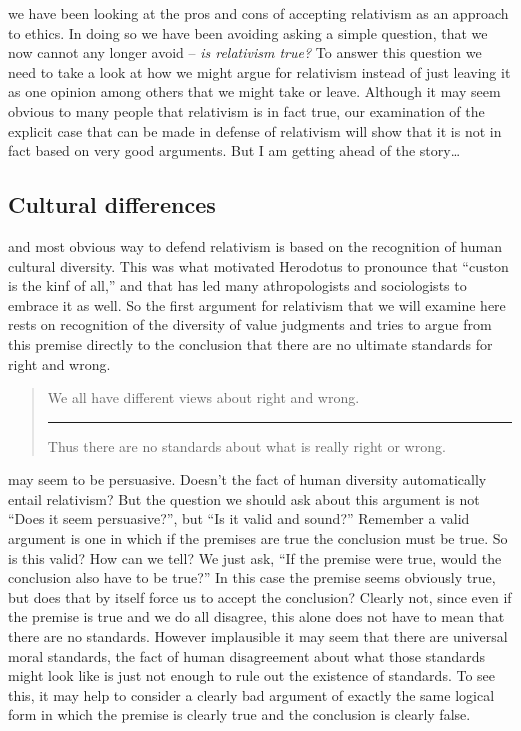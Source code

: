 \documentclass[justified]{tufte-book}
\newenvironment{argument}{\begin{quote}\normalsize}{\end{quote}}
\begin{document}
 we have been looking at the pros and cons of accepting relativism as an approach to ethics. In doing so we have been avoiding asking a simple question, that we now cannot any longer avoid -- \emph{is relativism true?} To answer this question we need to take a look at how we might argue for relativism instead of just leaving it as one opinion among others that we might take or leave. Although it may seem obvious to many people that relativism is in fact true, our examination of the explicit case that can be made in defense of relativism will show that it is not in fact based on very good arguments. But I am getting ahead of the story\ldots{}

\hypertarget{cultural-differences}{%
\subsection*{Cultural differences}\label{cultural-differences}}

 and most obvious way to defend relativism is based on the recognition of human cultural diversity. This was what motivated Herodotus to pronounce that ``custon is the kinf of all,'' and that has led many athropologists and sociologists to embrace it as well. So the first argument for relativism that we will examine here rests on recognition of the diversity of value judgments and tries to argue from this premise directly to the conclusion that there are no ultimate standards for right and wrong.

\begin{argument}
We all have different views about right and wrong.\\

\begin{center}\rule{0.5\linewidth}{\linethickness}\end{center}

Thus there are no standards about what is really right or wrong.
\end{argument}

 may seem to be persuasive. Doesn't the fact of human diversity automatically entail relativism? But the question we should ask about this argument is not ``Does it seem persuasive?'', but ``Is it valid and sound?'' Remember a valid argument is one in which if the premises are true the conclusion must be true. So is this valid? How can we tell? We just ask, ``If the premise were true, would the conclusion also have to be true?'' In this case the premise seems obviously true, but does that by itself force us to accept the conclusion? Clearly not, since even if the premise is true and we do all disagree, this alone does not have to mean that there are no standards. However implausible it may seem that there are universal moral standards, the fact of human disagreement about what those standards might look like is just not enough to rule out the existence of standards. To see this, it may help to consider a clearly bad argument of exactly the same logical form in which the premise is clearly true and the conclusion is clearly false.
\end{document}
